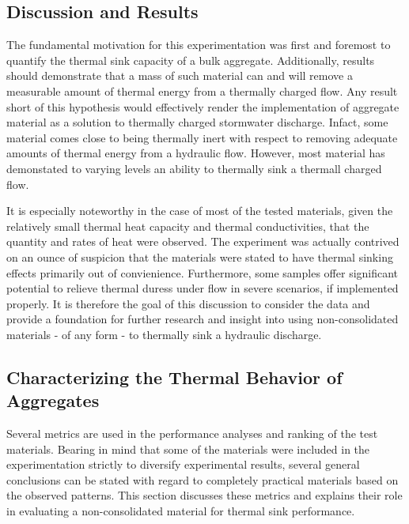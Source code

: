 

\begin{center}
\section{Discussion and Results}
\end{center}

The fundamental motivation for this experimentation was first and foremost to quantify the thermal sink capacity of a bulk aggregate. Additionally, results should demonstrate that a mass of such material can and will remove a measurable amount of thermal energy from a thermally charged flow. Any result short of this hypothesis would effectively render the implementation of aggregate material as a solution to thermally charged stormwater discharge. Infact, some material comes close to being thermally inert with respect to removing adequate amounts of thermal energy from a hydraulic flow. However, most material has demonstated to varying levels an ability to thermally sink a thermall charged flow.
 
It is especially noteworthy in the case of most of the tested materials, given the relatively small thermal heat capacity and thermal conductivities, that the quantity and rates of heat were observed. The experiment was actually contrived on an ounce of suspicion that the materials were stated to have thermal sinking effects primarily out of convienience. Furthermore, some samples offer significant potential to relieve thermal duress under flow in severe scenarios, if implemented properly. It is therefore the goal of this discussion to consider the data and provide a foundation for further research and insight into using non-consolidated materials - of any form - to thermally sink a hydraulic discharge.

\subsection{Characterizing the Thermal Behavior of Aggregates}

Several metrics are used in the performance analyses and ranking of the test materials. Bearing in mind that some of the materials were included in the experimentation strictly to diversify experimental results, several general conclusions can be stated with regard to completely practical materials based on the observed patterns. This section discusses these metrics and explains their role in evaluating a non-consolidated material for thermal sink performance.

